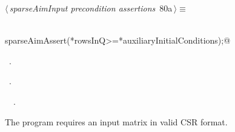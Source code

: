 \documentclass{article}
\begin{document}
\begin{flushleft} \small
\begin{minipage}{\linewidth}\label{scrap130}\raggedright\small
{} $\langle\,${\itshape sparseAimInput precondition assertions}\nobreak\ {\footnotesize {80a}}$\,\rangle\equiv$
\vspace{-1ex}
\begin{list}{}{} \item
\mbox{}\verb@@\\
\mbox{}\verb@      sparseAimAssert(*rowsInQ>=*auxiliaryInitialConditions);@\\
\mbox{}\verb@@{\NWsep}
\end{list}
\vspace{-1.5ex}
\footnotesize
\begin{list}{}{\setlength{\itemsep}{-\parsep}\setlength{\itemindent}{-\leftmargin}}
\item \NWtxtMacroDefBy\ .
\item \NWtxtMacroRefIn\ .
\item \NWtxtIdentsUsed\nobreak\  \verb@rowsInQ@\nobreak\ .
\item{}
\end{list}
\end{minipage}\vspace{4ex}
\end{flushleft}
The program requires an input matrix in valid CSR format.
\end{document}
